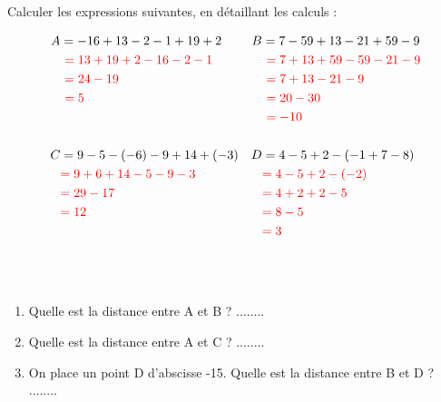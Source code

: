 \documentclass[Controle-correction]{subfiles}
\begin{document}
\begin{exercice}[(8 points)] Calculer les expressions suivantes, en détaillant les calculs :

	\begin{align*}
		A & = -16 + 13 - 2 - 1 + 19 + 2               & B & = 7 - 59 + 13 - 21 + 59 - 9                \\
		  & \ \correction{= 13 + 19 + 2 - 16 - 2 - 1} &   & \ \correction{= 7 + 13 + 59 - 59 - 21 - 9} \\
		  & \ \correction{= 24 - 19}                  &   & \ \correction{= 7 + 13 - 21 - 9}           \\
		  & \ \correction{= 5}                        &   & \ \correction{= 20 - 30}                   \\
		  &                                           &   & \ \correction{= -10}                       \\
		\\
		C & = 9 - 5 - (-6) - 9 + 14 + (-3)            & D & = 4 - 5 + 2 - (-1 + 7 - 8)                 \\
		  & \correction{= 9 + 6 + 14 - 5 - 9 - 3}     &   & \correction{= 4 - 5 + 2 - (-2)}            \\
		  & \correction{= 29 - 17}                    &   & \correction{= 4 + 2 + 2 - 5}               \\
		  & \correction{= 12}                         &   & \correction{= 8 - 5}                       \\
		  &                                           &   & \correction{= 3}                           \\
		\\
	\end{align*}
\end{exercice}

\begin{exercice}[(3 points)]\

	\begin{center}
	\end{center}

	\begin{enumerate}
		\item Quelle est la distance entre A et B ? ........
		\item Quelle est la distance entre A et C ? ........
		\item On place un point D d'abscisse -15. Quelle est la distance entre B et D ? ........
	\end{enumerate}
\end{exercice}
\end{document}
